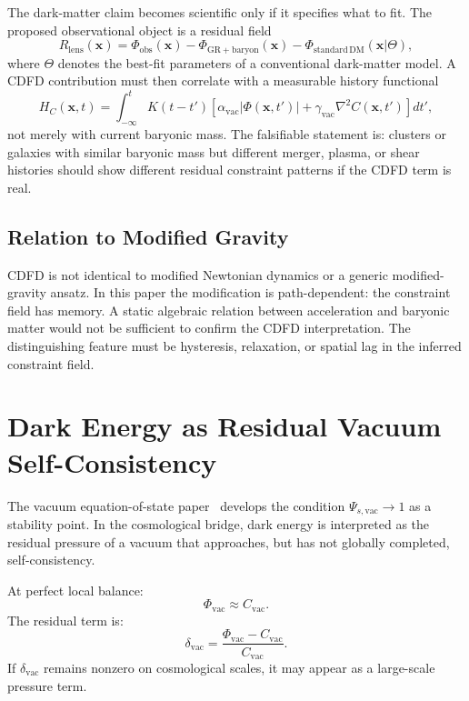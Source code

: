 \documentclass[11pt]{article}
\begin{document}
The dark-matter claim becomes scientific only if it specifies what to fit.
The proposed observational object is a residual field
\begin{equation}
    R_{\mathrm{lens}}(\mathbf{x})
    =
    \Phi_{\mathrm{obs}}(\mathbf{x})
    -
    \Phi_{\mathrm{GR+baryon}}(\mathbf{x})
    -
    \Phi_{\mathrm{standard\,DM}}(\mathbf{x}|\Theta),
\end{equation}
where $\Theta$ denotes the best-fit parameters of a conventional dark-matter
model. A CDFD contribution must then correlate with a measurable history
functional
\begin{equation}
    H_C(\mathbf{x},t)
    =
    \int_{-\infty}^{t}
    K(t-t')
    \left[
    \alpha_{\mathrm{vac}}|\Phi(\mathbf{x},t')|
    +\gamma_{\mathrm{vac}}\nabla^2C(\mathbf{x},t')
    \right]dt',
\end{equation}
not merely with current baryonic mass. The falsifiable statement is:
clusters or galaxies with similar baryonic mass but different merger,
plasma, or shear histories should show different residual constraint
patterns if the CDFD term is real.

\subsection{Relation to Modified Gravity}

CDFD is not identical to modified Newtonian dynamics or a generic
modified-gravity ansatz. In this paper the modification is path-dependent:
the constraint field has memory. A static algebraic relation between
acceleration and baryonic matter would not be sufficient to confirm the
CDFD interpretation. The distinguishing feature must be hysteresis,
relaxation, or spatial lag in the inferred constraint field.

\section{Dark Energy as Residual Vacuum Self-Consistency}

The vacuum equation-of-state paper~\cite{MujjabiX2026} develops the condition
$\Psi_{s,\mathrm{vac}}\to1$ as a stability point. In the cosmological bridge,
dark energy is interpreted as the residual pressure of a vacuum that approaches,
but has not globally completed, self-consistency.

At perfect local balance:
\begin{equation}
    \Phi_{\mathrm{vac}} \approx C_{\mathrm{vac}}.
\end{equation}
The residual term is:
\begin{equation}
    \delta_{\mathrm{vac}}
    =
    \frac{\Phi_{\mathrm{vac}}-C_{\mathrm{vac}}}{C_{\mathrm{vac}}}.
\end{equation}
If $\delta_{\mathrm{vac}}$ remains nonzero on cosmological scales, it may appear as a large-scale pressure term.
\end{document}
